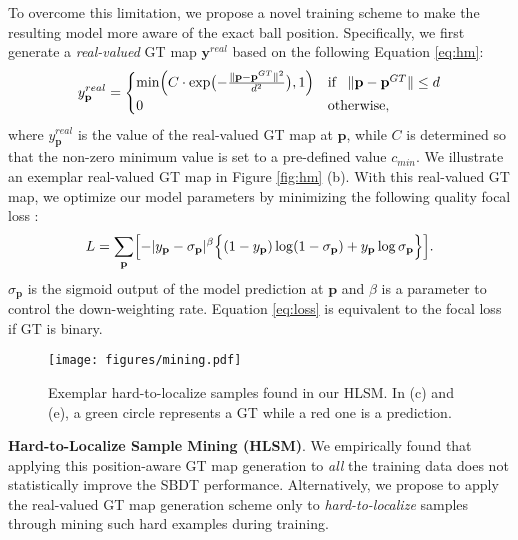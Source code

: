 \documentclass{bmvc2k}
\begin{document}
\par
To overcome this limitation, we propose a novel training scheme to make the resulting model more aware of the exact ball position.
Specifically, we first generate a {\it real-valued} GT map $\mathbf{y}^{real}$ based on the following Equation \ref{eq:hm}:
\begin{equation}
y_{\mathbf{p}}^{real} =
\begin{cases}
\min \Bigl( C \cdot \exp \bigl( - \frac{ \| \mathbf{p} - \mathbf{p}^{GT} \|^{2} }{ d^{2} } \bigr), 1 \Bigr) & \text{if} \;\;\; \| \mathbf{p} - \mathbf{p}^{GT} \| \leq d \\
0       & \text{otherwise},
\end{cases}
\label{eq:hm}
\end{equation}
where $y_{\mathbf{p}}^{real}$ is the value of the real-valued GT map at $\mathbf{p}$, while $C$ is determined so that the non-zero minimum value is set to a pre-defined value $c_{min}$.
We illustrate an exemplar real-valued GT map in Figure \ref{fig:hm} (b).
With this real-valued GT map, we optimize our model parameters by minimizing the following quality focal loss \cite{li+2020neurips,li+2020arxiv}:
\begin{equation}
L = \sum_{\mathbf{p}} \Bigl[ - | y_{\mathbf{p}} - \sigma_{\mathbf{p}} |^{\beta} \Bigl\{ ( 1-y_{\mathbf{p}} ) \log  ( 1-\sigma_{\mathbf{p}} ) + y_{\mathbf{p}} \log \sigma_{\mathbf{p}} \Bigr\} \Bigr].
\label{eq:loss}
\end{equation}
$\sigma_{\mathbf{p}}$ is the sigmoid output of the model prediction at $\mathbf{p}$ and $\beta$ is a parameter to control the down-weighting rate.
Equation \ref{eq:loss} is equivalent to the focal loss \cite{lin+2017iccv} if GT is binary.
\par
\vspace{1mm}
\begin{wrapfigure}{r}[0pt]{0.4\textwidth}
\vspace*{-4mm}
\centering
\texttt{[image: figures/mining.pdf]}
\caption{Exemplar hard-to-localize samples found in our HLSM. In (c) and (e), a green circle represents a GT while a red one is a prediction.}
\label{fig:mining}
\end{wrapfigure}
\noindent \textbf{Hard-to-Localize Sample Mining (HLSM)}.
We empirically found that applying this position-aware GT map generation to {\it all} the training data does not statistically improve the SBDT performance.
Alternatively, we propose to apply the real-valued GT map generation scheme only to {\it hard-to-localize} samples through mining such hard examples during training.
\end{document}
